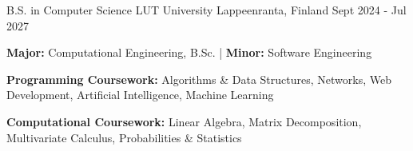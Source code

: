 

\begin{cventries}

  \cventryalt
    {B.S. in Computer Science} %
    {LUT University} %
    {Lappeenranta, Finland} %
    {Sept 2024 - Jul 2027} %
    {
      \begin{cvitems} %
        \item {\textbf{Major:} Computational Engineering, B.Sc. | \textbf{Minor:} Software Engineering}
        \item {\textbf{Programming Coursework:} Algorithms \& Data Structures, Networks, Web Development, Artificial Intelligence, Machine Learning}
        \item {\textbf{Computational Coursework:} Linear Algebra, Matrix Decomposition, Multivariate Calculus, Probabilities \& Statistics}
      \end{cvitems}
    }
\end{cventries}
\vspace{-3.0mm}